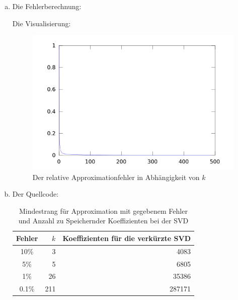 \documentclass[a4paper]{scrartcl}
\begin{document}
\begin{aufgabe}
	\begin{enumerate}[a)]
		\item
			Die Fehlerberechnung:
			
			Die Visualisierung:
			
			\begin{figure}[h]
				\centering
				\caption{Der relative Approximationfehler in Abhängigkeit von $k$}
				\includegraphics[scale=0.6]{num1_6_4/error.png}
			\end{figure}
\newpage
		\item			
			Der Quellcode:
			
			\begin{table}[h]
				\centering
				\caption{Mindestrang für Approximation mit gegebenem Fehler und Anzahl zu Speichernder Koeffizienten bei der SVD}
				\begin{tabular}{c|r|r}
					Fehler & $k$ & Koeffizienten für die verkürzte SVD \\ \hline
					10\% & 3 & 4083 \\
					5\% & 5 & 6805 \\
					1\% & 26 & 35386 \\
					0.1\% & 211 & 287171 
				\end{tabular}
			\end{table}


\end{enumerate}
\end{aufgabe}
\end{document}
